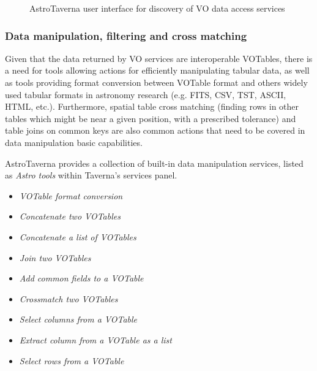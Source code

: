 \documentclass[final,authoryear,5p,times,twocolumn]{elsarticle}
\begin{document}
\begin{figure}[tb]
\centering 
{}
\caption{AstroTaverna user interface for discovery of VO data access services}
\label{fig:VODiscovery}
\end{figure}

\subsubsection{Data manipulation, filtering and cross matching}
\label{DataManipulation}

Given that the data returned by VO services are interoperable VOTables, there is a need for tools allowing actions for efficiently manipulating tabular data, as well as tools providing format conversion between VOTable format and others widely used tabular formats in astronomy research (e.g. FITS, CSV, TST, ASCII, HTML, etc.). Furthermore, spatial table cross matching (finding rows in other tables which might be near a given position, with a prescribed tolerance) and table joins on common keys are also common actions that need to be covered in data manipulation basic capabilities.

AstroTaverna provides a collection of built-in data manipulation services, listed as \textit{Astro tools} within Taverna's services panel.
\begin{itemize}
\item \textit{VOTable format conversion}
\item \textit{Concatenate two VOTables}
\item \textit{Concatenate a list of VOTables}
\item \textit{Join two VOTables}
\item \textit{Add common fields to a VOTable}
\item \textit{Crossmatch two VOTables}
\item \textit{Select columns from a VOTable}
\item \textit{Extract column from a VOTable as a list}
\item \textit{Select rows from a VOTable}
\end{itemize}
\end{document}
